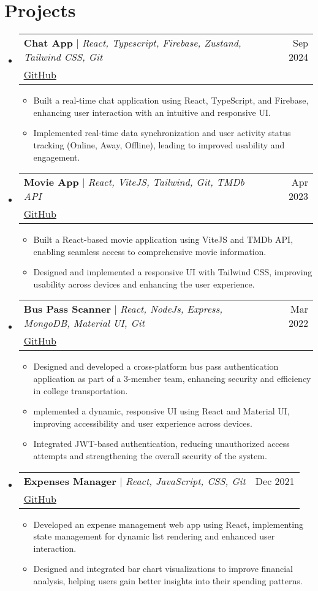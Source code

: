 \documentclass[letterpaper,11pt]{article}
\makeatletter
\newcommand{\resumeItem}[1]{
  \item\small{
    {#1 \vspace{-2pt}}
  }
}
\newcommand{\resumeProjectHeading}[3]{
    \item
    \begin{tabular*}{0.97\textwidth}{l@{\extracolsep{\fill}}r}
      \small#1 & #2 \\
      \multicolumn{2}{l}{\footnotesize#3} \\
    \end{tabular*}\vspace{-7pt}
}
\newcommand{\resumeSubHeadingListStart}{\begin{itemize}[leftmargin=0.15in, label={}]}
\newcommand{\resumeSubHeadingListEnd}{\end{itemize}}
\newcommand{\resumeItemListStart}{\begin{itemize}}
\newcommand{\resumeItemListEnd}{\end{itemize}\vspace{-5pt}}
\makeatother
\begin{document}
\section{Projects}
    \resumeSubHeadingListStart
      \resumeProjectHeading
          {\textbf{Chat App} $|$ \emph{React, Typescript, Firebase, Zustand, Tailwind CSS, Git}}{Sep 2024}
          {\href{https://github.com/aaryen-dsouza/chat-app}{\underline{GitHub}}}
          \resumeItemListStart
            \resumeItem{Built a real-time chat application using React, TypeScript, and Firebase, enhancing user interaction with an intuitive and responsive UI.}
            \resumeItem{Implemented real-time data synchronization and user activity status tracking (Online, Away, Offline), leading to improved usability and engagement.}
          \resumeItemListEnd
      \resumeProjectHeading
          {\textbf{Movie App} $|$ \emph{React, ViteJS, Tailwind, Git, TMDb API}}{Apr 2023}
          {\href{https://github.com/aaryen-dsouza/Movie-App}{\underline{GitHub}}}
          \resumeItemListStart
            \resumeItem{Built a React-based movie application using ViteJS and TMDb API, enabling seamless access to comprehensive movie information.}
            \resumeItem{Designed and implemented a responsive UI with Tailwind CSS, improving usability across devices and enhancing the user experience.}
          \resumeItemListEnd
          \resumeProjectHeading
          {\textbf{Bus Pass Scanner} $|$ \emph{React, NodeJs, Express, MongoDB, Material UI, Git}}{Mar 2022}
          {\href{https://github.com/aaryen-dsouza/BusPass_Scanner}{\underline{GitHub}}}
          \resumeItemListStart
            \resumeItem{Designed and developed a cross-platform bus pass authentication application as part of a 3-member team, enhancing security and efficiency in college transportation.}
            \resumeItem{mplemented a dynamic, responsive UI using React and Material UI, improving accessibility and user experience across devices.}
            \resumeItem{Integrated JWT-based authentication, reducing unauthorized access attempts and strengthening the overall security of the system.}
          \resumeItemListEnd
          \resumeProjectHeading
          {\textbf{Expenses Manager} $|$ \emph{React, JavaScript, CSS, Git}}{Dec 2021}
          {\href{https://github.com/aaryen-dsouza/Expenses-Manager}{\underline{GitHub}}}
          \resumeItemListStart
            \resumeItem{Developed an expense management web app using React, implementing state management for dynamic list rendering and enhanced user interaction.}
            \resumeItem{Designed and integrated bar chart visualizations to improve financial analysis, helping users gain better insights into their spending patterns.}
          \resumeItemListEnd
    \resumeSubHeadingListEnd
\end{document}
